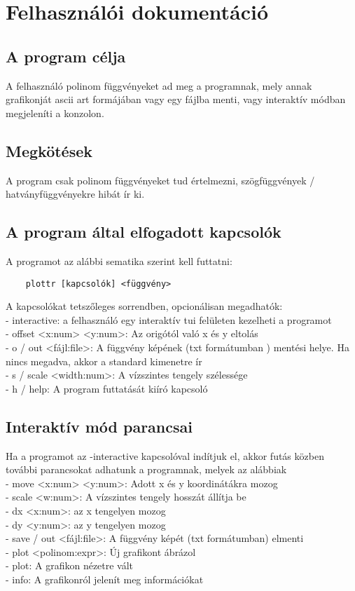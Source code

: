 \section{Felhasználói dokumentáció}

\subsection{A program célja}
A felhasználó polinom függvényeket ad meg a programnak, mely annak grafikonját ascii art formájában
vagy egy fájlba menti, vagy interaktív módban megjeleníti a konzolon.

\subsection{Megkötések}
A program csak polinom függvényeket tud értelmezni, szögfüggvények / hatványfüggvényekre hibát ír ki.


\subsection{A program által elfogadott kapcsolók}
A programot az alábbi sematika szerint kell futtatni:
\begin{verbatim}
    plottr [kapcsolók] <függvény>
\end{verbatim}
A kapcsolókat tetszőleges sorrendben, opcionálisan megadhatók:\\
 - interactive: a felhasználó egy interaktív tui felületen kezelheti a programot\\
 - offset <x:num> <y:num>: Az origótól való x és y eltolás\\
 - o / out <fájl:file>: A függvény képének (txt formátumban ) mentési helye.
        Ha nincs megadva, akkor a standard kimenetre ír\\
 - s / scale <width:num>: A vízszintes tengely szélessége\\
 - h / help: A program futtatását kiíró kapcsoló\\

\subsection{Interaktív mód parancsai}
Ha a programot az -interactive kapcsolóval indítjuk el, akkor futás közben
további parancsokat adhatunk a programnak, melyek az alábbiak\\
 - move <x:num> <y:num>: Adott x és y koordinátákra mozog\\
 - scale <w:num>: A vízszintes tengely hosszát állítja be\\
 - dx <x:num>: az x tengelyen mozog\\
 - dy <y:num>: az y tengelyen mozog\\
 - save / out <fájl:file>: A függvény képét (txt formátumban) elmenti\\
 - plot <polinom:expr>: Új grafikont ábrázol\\
 - plot: A grafikon nézetre vált\\
 - info: A grafikonról jelenít meg információkat\\